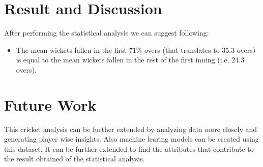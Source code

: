 \documentclass[fleqn,10pt]{wlscirep}
\begin{document}
\section{Result and Discussion}
After performing the statistical analysis we can suggest following:
\begin{itemize}
    \item The mean wickets fallen in the first 71\% overs (that translates to 35.3 overs) is equal to the mean wickets fallen in the rest of the first inning (i.e. 24.3 overs).
\end{itemize}
\section{Future Work}
This cricket analysis can be further extended by analyzing data more closely and generating player wise insights. Also machine learing models can
be created using this dataset. It can be further extended to find the attributes that contribute to the result obtained of the statistical analysis.
\appendix
\end{document}
